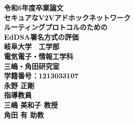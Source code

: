 \documentclass[
  luatex,
  paper=a4paper,
  fontsize=11pt,
  report,
  jlreq_notes,
]{jlreq}
\begin{document}





\begin{titlepage}
  \centering
  \textbf{
  {\large 令和6年度卒業論文}\\
  \vspace{2em}
  {\LARGE セキュアなV2Vアドホックネットワーク\\
  ルーティングプロトコルのための\\[0.5em]
  EdDSA署名方式の評価}\\
  \vspace{4em}
  {\large 岐阜大学　工学部}\\
  {\large 電気電子・情報工学科}\\
  \vspace{2em}
  {\large 三嶋・角田研究室}\\
  \vspace{2em}
  {\large 学籍番号：1213033107}\\
  \vspace{2em}
  {\Large 永野 正剛}\\
  \vspace{3em}
  {\large 指導教員}\\
  \vspace{1em}
  {\large 三嶋 美和子 教授}\\
  \vspace{1em}
  {\large 角田 有 助教}\\}
  \vfill
  \restoregeometry %

\end{titlepage}
\end{document}
